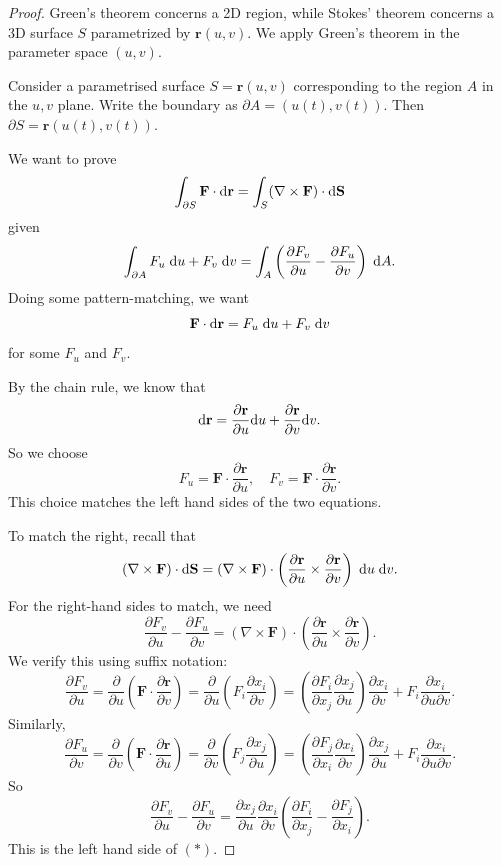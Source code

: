 \documentclass[a4paper]{article}
\begin{document}
\begin{proof}
  Green's theorem concerns a 2D region, while Stokes' theorem concerns a 3D surface $S$ parametrized by $\mathbf{r}(u, v)$. We apply Green's theorem in the parameter space $(u, v)$.

  Consider a parametrised surface $S = \mathbf{r}(u, v)$ corresponding to the region $A$ in the $u, v$ plane. Write the boundary as $\partial A = (u(t), v(t))$. Then $\partial S = \mathbf{r}(u(t), v(t))$.

  We want to prove
  \[
    \int_{\partial S}\mathbf{F}\cdot \mathrm{d} \mathbf{r} = \int_S (\nabla \times \mathbf{F})\cdot \mathrm{d} \mathbf{S}
  \]
  given
  \[
    \int_{\partial A} F_u\;\mathrm{d} u + F_v\;\mathrm{d} v = \int_A\left(\frac{\partial F_v}{\partial u} - \frac{\partial F_u}{\partial v}\right)\;\mathrm{d} A.
  \]
  Doing some pattern-matching, we want
  \[
    \mathbf{F}\cdot \mathrm{d} \mathbf{r} = F_u \;\mathrm{d} u + F_v \;\mathrm{d} v
  \]
  for some $F_u$ and $F_v$.

  By the chain rule, we know that
  \[
    \mathrm{d} \mathbf{r} = \frac{\partial \mathbf{r}}{\partial u} \mathrm{d} u + \frac{\partial \mathbf{r}}{\partial v}\mathrm{d} v.
  \]
  So we choose
  \[
    F_u = \mathbf{F}\cdot \frac{\partial \mathbf{r}}{\partial u}, \quad F_v = \mathbf{F}\cdot\frac{\partial \mathbf{r}}{\partial v}.
  \]
  This choice matches the left hand sides of the two equations.

  To match the right, recall that
  \[
    (\nabla\times \mathbf{F}) \cdot \mathrm{d} \mathbf{S} = (\nabla\times \mathbf{F})\cdot \left(\frac{\partial \mathbf{r}}{\partial u}\times \frac{\partial \mathbf{r}}{\partial v}\right)\;\mathrm{d} u\;\mathrm{d} v.
  \]
  For the right-hand sides to match, we need
  \[
    \frac{\partial F_v}{\partial u} - \frac{\partial F_u}{\partial v} = (\nabla\times \mathbf{F})\cdot \left(\frac{\partial \mathbf{r}}{\partial u}\times \frac{\partial \mathbf{r}}{\partial v}\right).\tag{$*$}
  \]
  We verify this using suffix notation:
  \[
    \frac{\partial F_v}{\partial u} = \frac{\partial}{\partial u}\left(\mathbf{F}\cdot \frac{\partial \mathbf{r}}{\partial v}\right) = \frac{\partial}{\partial u}\left(F_i\frac{\partial x_i}{\partial v}\right) = \left(\frac{\partial F_i}{\partial x_j}\frac{\partial x_j}{\partial u}\right)\frac{\partial x_i}{\partial v} + F_i\frac{\partial x_i}{\partial u\partial v}.
  \]
  Similarly,
  \[
    \frac{\partial F_u}{\partial v} = \frac{\partial}{\partial v}\left(\mathbf{F}\cdot \frac{\partial \mathbf{r}}{\partial u}\right) = \frac{\partial}{\partial v}\left(F_j\frac{\partial x_j}{\partial u}\right) = \left(\frac{\partial F_j}{\partial x_i}\frac{\partial x_i}{\partial v}\right)\frac{\partial x_j}{\partial u} + F_i\frac{\partial x_i}{\partial u\partial v}.
  \]
  So
  \[
    \frac{\partial F_v}{\partial u} - \frac{\partial F_u}{\partial v} = \frac{\partial x_j}{\partial u}\frac{\partial x_i}{\partial v}\left(\frac{\partial F_i}{\partial x_j} - \frac{\partial F_j}{\partial x_i}\right).
  \]
  This is the left hand side of $(*)$.


\end{proof}
\end{document}
